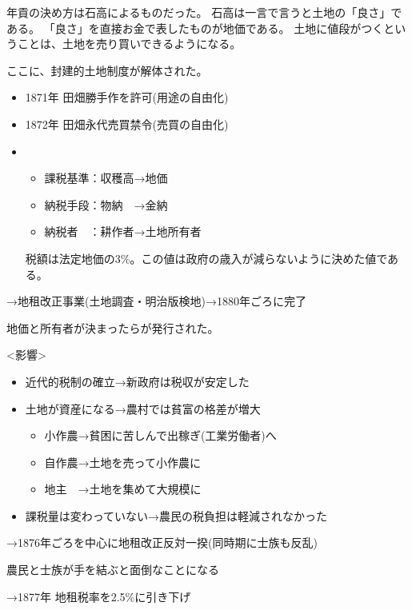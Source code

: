 \documentclass[12pt]{ltjsarticle}
\begin{document}
年貢の決め方は石高によるものだった。
石高は一言で言うと土地の「良さ」である。
「良さ」を直接お金で表したものが地価である。
土地に値段がつくということは、土地を売り買いできるようになる。

ここに、封建的土地制度が解体された。
\begin{itemize}
\item 1871年 田畑勝手作を許可(用途の自由化)
\item 1872年 田畑永代売買禁令(売買の自由化)
\item {}
\begin{itemize}
\item 課税基準：収穫高→地価
\item 納税手段：物納　→金納
\item 納税者　：耕作者→土地所有者
\end{itemize}
税額は法定地価の3\%。この値は政府の歳入が減らないように決めた値である。
\end{itemize}

→地租改正事業(土地調査・明治版検地)→1880年ごろに完了

地価と所有者が決まったらが発行された。

<影響>
\begin{itemize}
\item 近代的税制の確立→新政府は税収が安定した
\item 土地が資産になる→農村では貧富の格差が増大
\begin{itemize}
\item 小作農→貧困に苦しんで出稼ぎ(工業労働者)へ
\item 自作農→土地を売って小作農に
\item 地主　→土地を集めて大規模に
\end{itemize}
\item 課税量は変わっていない→農民の税負担は軽減されなかった
\end{itemize}
→1876年ごろを中心に地租改正反対一揆(同時期に士族も反乱)

農民と士族が手を結ぶと面倒なことになる

→1877年 地租税率を2.5\%に引き下げ
\end{document}
